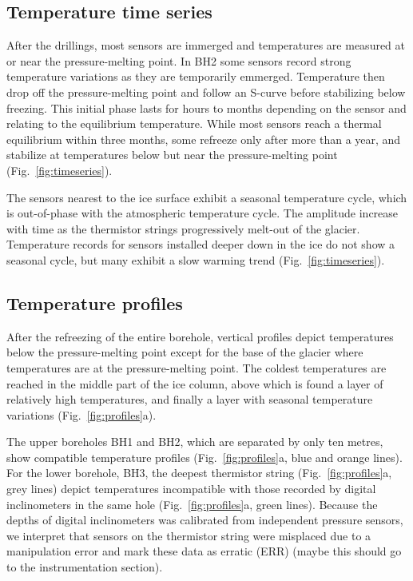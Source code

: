 \documentclass[utf8]{article}
\begin{document}
\subsection{Temperature time series}

    After the drillings, most sensors are immerged and temperatures are
    measured at or near the pressure-melting point. In BH2 some sensors record
    strong temperature variations as they are temporarily emmerged. Temperature
    then drop off the pressure-melting point and follow an S-curve before
    stabilizing below freezing. This initial phase lasts for hours to months
    depending on the sensor and relating to the equilibrium temperature. While
    most sensors reach a thermal equilibrium within three months, some refreeze
    only after more than a year, and stabilize at temperatures below but near
    the pressure-melting point (Fig.~\ref{fig:timeseries}).

    The sensors nearest to the ice surface exhibit a seasonal temperature
    cycle, which is out-of-phase with the atmospheric temperature cycle. The
    amplitude increase with time as the thermistor strings progressively
    melt-out of the glacier. Temperature records for sensors installed deeper
    down in the ice do not show a seasonal cycle, but many exhibit a slow
    warming trend (Fig.~\ref{fig:timeseries}).


\subsection{Temperature profiles}

    After the refreezing of the entire borehole, vertical profiles depict
    temperatures below the pressure-melting point except for the base of the
    glacier where temperatures are at the pressure-melting point. The coldest
    temperatures are reached in the middle part of the ice column, above which
    is found a layer of relatively high temperatures, and finally a layer with
    seasonal temperature variations (Fig.~\ref{fig:profiles}a).

    The upper boreholes BH1 and BH2, which are separated by only ten metres,
    show compatible temperature profiles (Fig.~\ref{fig:profiles}a, blue and
    orange lines). For the lower borehole, BH3, the deepest thermistor string
    (Fig.~\ref{fig:profiles}a, grey lines) depict temperatures incompatible
    with those recorded by digital inclinometers in the same hole
    (Fig.~\ref{fig:profiles}a, green lines). Because the depths of
    digital inclinometers was calibrated from independent pressure sensors, we
    interpret that sensors on the thermistor string were misplaced due to a
    manipulation error and mark these data as erratic (ERR) (maybe this should
    go to the instrumentation section).
\end{document}
